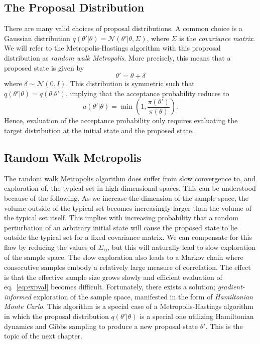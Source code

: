 \subsection{The Proposal Distribution}
There are many valid choices of proposal distributions. A common choice is a Gaussian distribution $q(\theta'|\theta) = \mathcal{N}(\theta'|\theta, \Sigma)$,
where $\Sigma$ is the \textit{covariance matrix}.
We will refer to the Metropolis-Hastings algorithm with this proprosal distribution as \textit{random walk Metropolis}.
More precisely, this means that a proposed state is given by
\begin{equation}
  \theta' = \theta + \delta
\end{equation}
where $\delta \sim \mathcal{N}(0, I)$. This distribution is symmetric such that $q(\theta'|\theta) = q(\theta|\theta')$, implying that the acceptance probability
reduces to
\begin{equation}\label{eq:symmetric_acceptance_prob}
    a(\theta'|\theta) = \min \left(1, \frac{\pi(\theta')}{\pi(\theta)}\right).
\end{equation}
Hence, evaluation of the acceptance probability only requires evaluating the target distribution at the initial state and the proposed state.

\subsection{Random Walk Metropolis}
The random walk Metropolis algorithm does suffer from slow convergence to, and exploration of, the typical set in high-dimensional spaces.
This can be understood because of the following. 
As we increase the dimension of the sample space, the volume outside of the typical set becomes increasingly larger than the volume of the typical set itself.
This implies with increasing probability that a random perturbation of an arbitrary initial state will cause the proposed state
to lie outside the typical set for a fixed covariance matrix.
We can compensate
for this flaw by reducing the values of $\Sigma_{ij}$, but this will naturally lead to slow exploration of the
sample space. The slow exploration also leads to a Markov chain where consecutive
samples embody
a relatively large measure of correlation. The effect is that the effective sample size grows slowly
and efficient evaluation of eq.~\eqref{eq:expval} becomes difficult.
Fortunately, there exists a solution; \textit{gradient-informed} exploration of the sample space, manifested in
the form of \textit{Hamiltonian Monte Carlo}. This algorithm is a special case of a Metropolis-Hastings algorithm
in which the proposal distribution $q(\theta'|\theta)$ is a special one utilizing Hamiltonian dynamics and Gibbs sampling
to produce a new proposal state $\theta'$. This is the topic of the next chapter.


